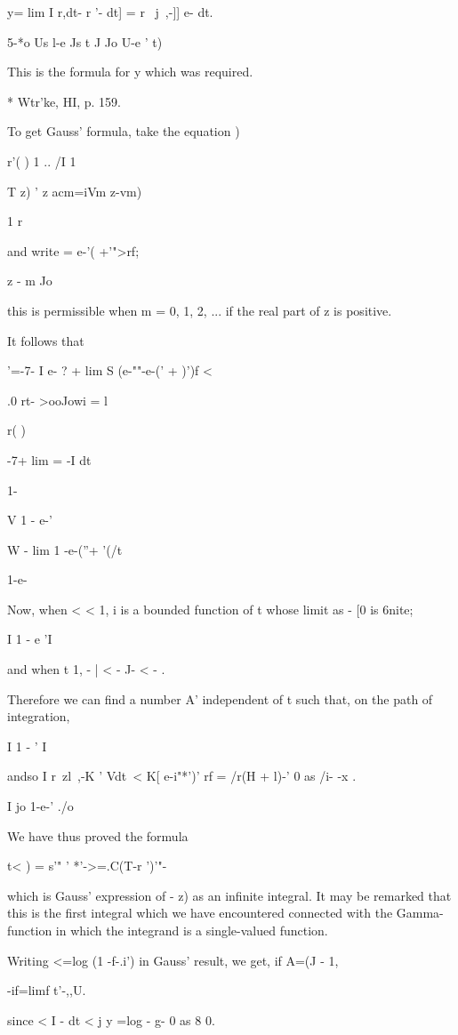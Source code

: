 y= lim I r,dt- r '- dt] = r \ j~,-]] e- dt.

5-*o Us l-e Js t J Jo U-e ' t)

This is the formula for y which was required.

* Wtr'ke, HI, p. 159.

%
%

To get Gauss' formula, take the equation )

r'( ) 1 .. /I 1 \

T z) ' z acm=iVm z-vm)

1 r

and write = e-'( +'">rf;

z - m Jo

this is permissible when m = 0, 1, 2, ... if the real part of z is
positive.

It follows that

 '=-7- I e- ? + lim S (e-""-e-(' + )')f <

.0 rt- >ooJowi = l

r( )

-7+ lim = -I dt

1-

V 1 - e-'

W - lim 1 -e-(''+ '(/t

1-e-

Now, when < < 1, i is a bounded function of t whose limit as - [0 is
6nite;

I 1 - e 'I

and when t 1, - | < - J- < - .

Therefore we can find a number A' independent of t such that, on the
path of integration,

I 1 - ' I

andso I r\ zl~,-K ' Vdt\ < K[ e-i"*')' rf = /r(H + l)-' 0 as /i- -x .

I jo 1-e-' ./o

We have thus proved the formula

t< ) = s'" ' *'->=.C(T-r ')'"-

which is Gauss' expression of - z) as an infinite integral. It may be
remarked that this is the first integral which we have encountered
connected with the Gamma-function in which the integrand is a
single-valued function.

Writing <=log (1 -f-.i') in Gauss' result, we get, if A=(J - 1,

 -if=limf t'-,,U.

since < I - dt < j y =log - g- 0 as 8 0.

